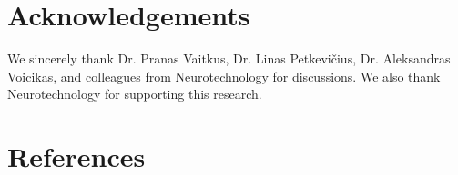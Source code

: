\documentclass{article}
\begin{document}
{

\section{Acknowledgements}

We sincerely thank Dr. Pranas Vaitkus, Dr. Linas Petkevi\v{c}ius, Dr. Aleksandras Voicikas, and colleagues from Neurotechnology for discussions. We also thank Neurotechnology for supporting this research.

\section*{References}


%


{\footnotesize
	}

}
\end{document}
